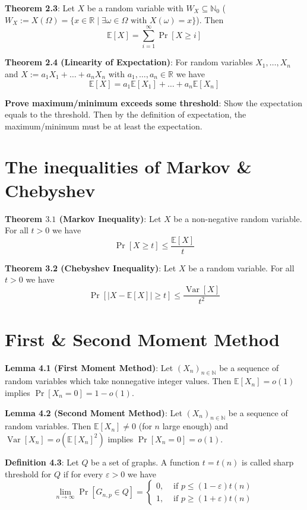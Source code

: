 \textbf{Theorem 2.3}: Let $X$ be a random variable with $W_{X} \subseteq \mathbb{N}_{0}$ ($W_{X}:=X(\Omega)=\{x \in \mathbb{R} \mid \exists \omega \in \Omega \text { with } X(\omega)=x\}$). Then
$$
\mathbb{E}[X]=\sum_{i=1}^{\infty} \operatorname{Pr}[X \geq i]
$$

\textbf{Theorem 2.4 (Linearity of Expectation)}: For random variables $X_{1}, \ldots, X_{n}$ and $X:=a_{1} X_{1}+\ldots+a_{n} X_{n}$ with $a_{1}, \ldots, a_{n} \in \mathbb{R}$ we have
$$
\mathbb{E}[X]=a_{1} \mathbb{E}\left[X_{1}\right]+\ldots+a_{n} \mathbb{E}\left[X_{n}\right]
$$

\textbf{Prove maximum/minimum exceeds some threshold}: Show the expectation equals to the threshold. Then by the definition of expectation, the maximum/minimum must be at least the expectation.

\section{The inequalities of Markov \& Chebyshev}

\textbf{Theorem $3.1$ (Markov Inequality)}: Let $X$ be a non-negative random variable. For all $t>0$ we have
$$
\operatorname{Pr}[X \geq t] \leq \frac{\mathbb{E}[X]}{t}
$$

\textbf{Theorem 3.2 (Chebyshev Inequality)}: Let $X$ be a random variable. For all $t>0$ we have
$$
\operatorname{Pr}[|X-\mathbb{E}[X]| \geq t] \leq \frac{\operatorname{Var}[X]}{t^{2}}
$$

\section{First \& Second Moment Method}

\textbf{Lemma 4.1 (First Moment Method)}: Let $\left(X_{n}\right)_{n \in \mathbb{N}}$ be a sequence of random variables which take nonnegative integer values. Then
$\mathbb{E}\left[X_{n}\right]=o(1) $ implies $ \operatorname{Pr}\left[X_{n}=0\right]=1-o(1)$.

\textbf{Lemma 4.2 (Second Moment Method)}: Let $\left(X_{n}\right)_{n \in \mathbb{N}}$ be a sequence of random variables. Then $\mathbb{E}\left[X_{n}\right] \neq 0$ (for $n$ large enough) and $\operatorname{Var}\left[X_{n}\right]=o\left(\mathbb{E}\left[X_{n}\right]^{2}\right) $ implies $ \operatorname{Pr}\left[X_{n}=0\right]=o(1).$

\textbf{Definition 4.3}: Let $Q$ be a set of graphs. A function $t=t(n)$ is called sharp threshold for $Q$ if for every $\varepsilon>0$ we have
$$
\lim _{n \rightarrow \infty} \operatorname{Pr}\left[G_{n, p} \in Q\right]= \begin{cases}0, & \text { if } p \leq(1-\varepsilon) t(n) \\ 1, & \text { if } p \geq(1+\varepsilon) t(n)\end{cases}
$$


